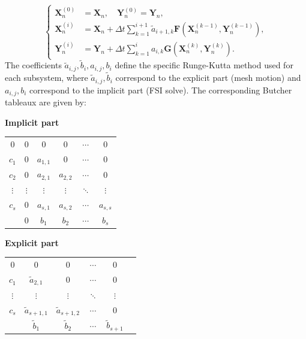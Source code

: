 \documentclass{article}
\begin{document}
\begin{equation}
    \left\{
    \begin{aligned}
        \mathbf{X}_n^{(0)} &= \mathbf{X}_n, \quad \mathbf{Y}_n^{(0)} = \mathbf{Y}_n,\\
        \mathbf{X}_n^{(i)} &= \mathbf{X}_n + \Delta t \sum_{k=1}^{i+1} \tilde{a}_{i+1,k} \mathbf{F}(\mathbf{X}_n^{(k-1)}, \mathbf{Y}_n^{(k-1)}), \\
        \mathbf{Y}_n^{(i)} &= \mathbf{Y}_n + \Delta t \sum_{k=1}^i a_{i,k} \mathbf{G}(\mathbf{X}_n^{(k)}, \mathbf{Y}_n^{(k)}).
    \end{aligned}
    \right.
\end{equation}
The coefficients $\tilde{a}_{i,j}, \tilde{b}_i, a_{i,j}, b_i$ define the specific Runge-Kutta method used for each subsystem, where $\tilde{a}_{i,j}, \tilde{b}_i$ correspond to the explicit part (mesh motion) and $a_{i,j}, b_i$ correspond to the implicit part (FSI solve). The corresponding Butcher tableaux are given by:
\begin{center}
\begin{minipage}{0.45\textwidth}
\centering
\textbf{Implicit part}
\begin{tabular}{c|ccccc}
    0 & 0 & 0 & 0 & $\cdots$ & $0$\\
  $c_1$ & 0 & $a_{1,1}$ & $0$ & $\cdots$ & $0$\\
  $c_2$ & 0 & $a_{2,1}$ & $a_{2,2}$ & $\cdots$ & $0$\\
  $\vdots$ & $\vdots$ & $\vdots$ & $\vdots$ & $\ddots$ & $\vdots$\\
  $c_s$ & 0 & $a_{s,1}$ & $a_{s,2}$ & $\cdots$ & $a_{s,s}$\\
  \hline
    & 0 & $b_1$ & $b_2$ & $\cdots$ & $b_s$ \\
\end{tabular}
\end{minipage}
\hfill
\begin{minipage}{0.45\textwidth}
\centering
\textbf{Explicit part}
\begin{tabular}{c|ccccc}
  $0$ & $0$ & $0$ & $\cdots$ & $0$\\
  $c_1$ & $\tilde{a}_{2,1}$ & $0$ & $\cdots$ & $0$\\
  $\vdots$ & $\vdots$ & $\vdots$ & $\ddots$ & $\vdots$\\
  $c_s$ & $\tilde{a}_{s+1,1}$ & $\tilde{a}_{s+1,2}$ & $\cdots$ & $0$\\
  \hline
    & $\tilde{b}_1$ & $\tilde{b}_2$ & $\cdots$ & $\tilde{b}_{s+1}$ \\
\end{tabular}
\end{minipage}
\end{center}
\end{document}
